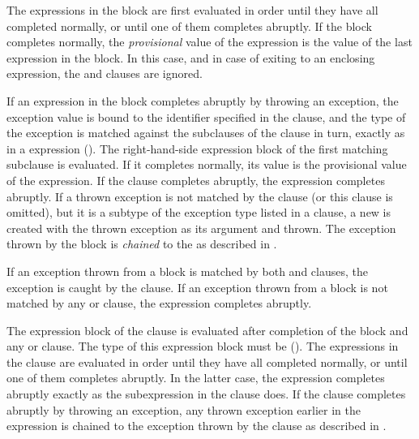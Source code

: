 The expressions in the  block are first evaluated in order
until they have all completed normally, or until one of them completes
abruptly.  If the  block completes normally, the
\emph{provisional} value of the  expression is the value of the
last expression in the  block.  In this case, and in case of
exiting to an enclosing  expression, the  and
 clauses are ignored.


If an expression in the  block completes abruptly by throwing
an exception, the exception value is bound to the identifier specified in
the  clause, and the type of the exception is matched
against the subclauses of the  clause in turn, exactly as in a
 expression ().
The right-hand-side expression block
of the first matching subclause is evaluated.  If it
completes normally, its value is the provisional value of the
 expression.  If the  clause completes abruptly,
the  expression completes abruptly.  If a thrown exception is
not matched by the  clause (or this clause is omitted), but
it is a subtype of the exception type listed in a
 clause, a new
 is created with the thrown exception as its
argument and thrown.
The exception thrown by the  block is \emph{chained} to the
 as described in
.


If an exception thrown from a  block is matched by both
 and  clauses, the exception is caught by the
 clause.
If an exception thrown from a  block is not matched by any
 or  clause, the  expression completes
abruptly.


The expression block of the  clause
is evaluated after completion of the  block
and any  or  clause.
The type of this expression block must be ().
The expressions in the  clause are evaluated in order until
they have all completed normally, or until one of them completes abruptly.
In the latter case, the  expression completes abruptly exactly as
the subexpression in the  clause does.
If the  clause completes abruptly by throwing an exception,
any thrown exception earlier in the  expression is chained to the
exception thrown by the  clause as described in
.


